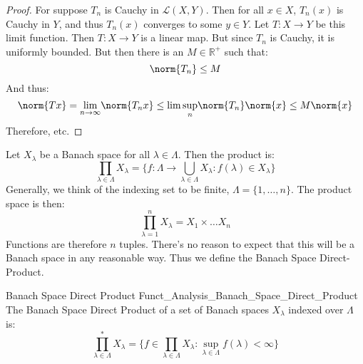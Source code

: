         \begin{proof}
            For suppose $T_{n}$ is Cauchy in
            $\mathscr{L}(X,Y)$. Then for all $x\in{X}$,
            $T_{n}(x)$ is Cauchy in $Y$, and thus
            $T_{n}(x)$ converges to some $y\in{Y}$. Let
            $T:X\rightarrow{Y}$ be this limit function. Then
            $T:X\rightarrow{Y}$ is a linear map. But since
            $T_{n}$ is Cauchy, it is uniformly bounded. But then
            there is an $M\in\mathbb{R}^{+}$ such that:
            \begin{equation}
                \norm{T_{n}}\leq{M}
            \end{equation}
            And thus:
            \begin{equation}
                \norm{T{x}}=
                \underset{n\rightarrow\infty}{\lim}
                \norm{T_{n}x}\leq
                \lim\underset{n}{\sup}\norm{T_{n}}\norm{x}
                \leq{M}\norm{x}
            \end{equation}
            Therefore, etc.
        \end{proof}
        Let $X_{\lambda}$ be a Banach space for all
        $\lambda\in\Lambda$. Then the product is:
        \begin{equation}
            \prod_{\lambda\in\Lambda}X_{\lambda}
            =\{f:\Lambda\rightarrow\bigcup_{\lambda\in\Lambda}
            X_{\lambda}:f(\lambda)\in{X}_{\lambda}\}
        \end{equation}
        Generally, we think of the indexing set to be finite,
        $\Lambda=\{1,\dots,n\}$. The product space is then:
        \begin{equation}
            \prod_{\lambda=1}^{n}X_{\lambda}=
            X_{1}\times\dots{X}_{n}
        \end{equation}
        Functions are therefore $n$ tuples. There's no reason to
        expect that this will be a Banach space in any reasonable
        way. Thus we define the Banach Space Direct-Product.
        \begin{ldefinition}{Banach Space Direct Product}
              {Funct_Analysis_Banach_Space_Direct_Product}
            The Banach Space Direct Product of a set of Banach
            spaces $X_{\lambda}$ indexed over $\Lambda$ is:
            \begin{equation}
                \prod_{\lambda\in\Lambda}^{*}X_{\lambda}
                =\{f\in\prod_{\lambda\in\Lambda}X_{\lambda}:
                \underset{\lambda\in\Lambda}{\sup}
                f(\lambda)<\infty\}
            \end{equation}
        \end{ldefinition}

